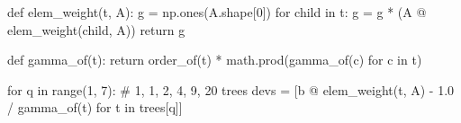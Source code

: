 \begin{pycode}
def elem_weight(t, A):
    g = np.ones(A.shape[0])
    for child in t:
        g = g * (A @ elem_weight(child, A))
    return g

def gamma_of(t):
    return order_of(t) * math.prod(gamma_of(c) for c in t)

for q in range(1, 7):                                  # 1, 1, 2, 4, 9, 20 trees
    devs = [b @ elem_weight(t, A) - 1.0 / gamma_of(t) for t in trees[q]]
\end{pycode}
